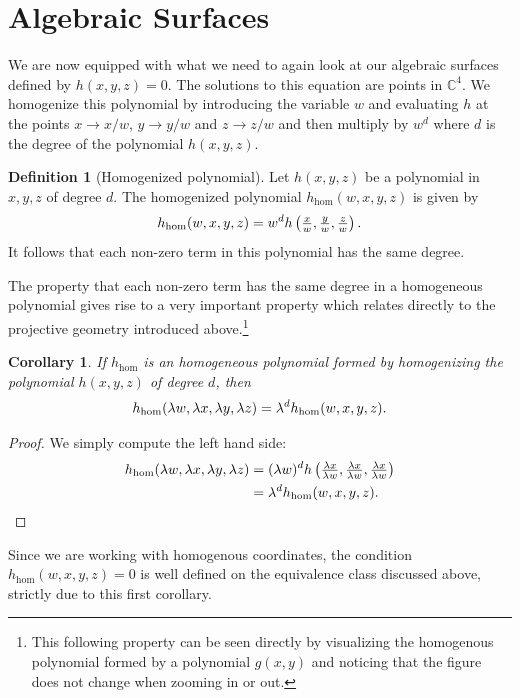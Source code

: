 \documentclass[a4paper]{article}
\theoremstyle{definition}
\newtheorem{defn}{Definition}
\theoremstyle{plain}
\newtheorem{crl}{Corollary}
\newcommand{\C}{\ensuremath{\mathbb{C}}}
\renewcommand{\hom}{\ensuremath{h_{\mathrm{hom}}}}
\begin{document}
    \section{Algebraic Surfaces}
    \label{sec:algebraic_surfaces}
    
    We are now equipped with what we need to again look at our algebraic
    surfaces defined by $h(x, y, z) = 0$. The solutions to this equation are
    points in $\C^4$. We homogenize this polynomial by introducing the variable
    $w$ and evaluating $h$ at the points $x \to x/w$, $y \to y/w$ and $z \to
    z/w$ and then multiply by $w^d$ where $d$ is the degree of the polynomial
    $h(x, y, z)$. 

    \begin{defn}[Homogenized polynomial]
        Let $h(x, y, z)$ be a polynomial in $x, y, z$ of degree $d$. 
        The homogenized polynomial $\hom(w, x, y, z)$ is given by
        \begin{equation}
            \notag
            \hom(w, x, y, z) = w^d h \left( \tfrac{x}{w}, \tfrac{y}{w}, \tfrac{z}{w} \right).
        \end{equation}
        It follows that each non-zero term in this polynomial has the same
        degree.
    \end{defn}
    The property that each non-zero term has the same degree in a homogeneous
    polynomial gives rise to a very important property which relates directly
    to the projective geometry introduced above.\footnote{This following
    property can be seen directly by visualizing the homogenous polynomial
    formed by a polynomial $g(x, y)$ and noticing that the figure does not
    change when zooming in or out.}
    
    \begin{crl}
        If $\hom$ is an homogeneous polynomial formed by homogenizing the
        polynomial $h(x, y, z)$ of degree $d$, then
        \begin{equation}
            \notag
            \hom(\lambda w, \lambda x, \lambda y, \lambda z) = \lambda^d \hom(w, x, y, z).
        \end{equation}
    \end{crl}
    \begin{proof}
        We simply compute the left hand side:
        \begin{align*}
            \notag
            \hom(\lambda w, \lambda x, \lambda y, \lambda z) &= (\lambda w)^d h
            \left( \tfrac{\lambda x}{\lambda w}, \tfrac{\lambda x}{\lambda w},
            \tfrac{\lambda x}{\lambda w}\right) \\ &= \lambda^d \hom(w, x, y,
            z).
        \end{align*}
    \end{proof}
    Since we are working with homogenous coordinates, the condition $\hom(w, x,
    y, z) = 0$ is well defined on the equivalence class discussed above,
    strictly due to this first corollary.
   
\end{document}
